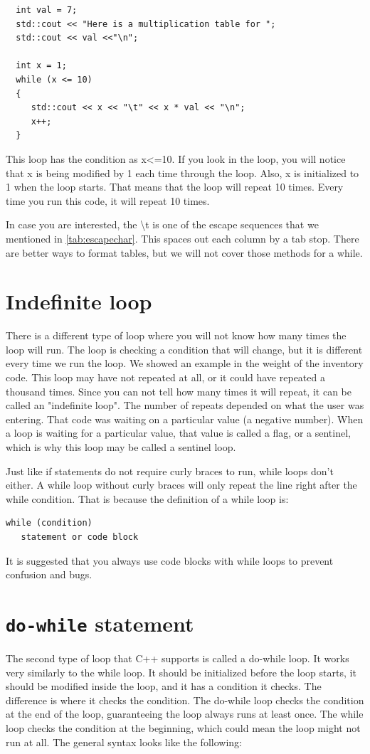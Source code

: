 \begin{lstlisting}
  int val = 7;
  std::cout << "Here is a multiplication table for ";
  std::cout << val <<"\n";
  
  int x = 1;
  while (x <= 10)
  {
     std::cout << x << "\t" << x * val << "\n";
     x++;
  }
\end{lstlisting}
This loop has the condition as x<=10. If you look in the loop, you will notice that
x is being modified by 1 each time through the loop. Also, x is initialized to 1
when the loop starts. That means that the loop will repeat 10 times. Every time you
run this code, it will repeat 10 times.

In case you are interested, the \textbackslash t is one of the escape sequences that
we mentioned in \ref{tab:escapechar}. This spaces out each column by a tab stop. There 
are better ways to format tables, but we will not cover those methods for a while.

\section{Indefinite loop}
There is a different type of loop where you will not know how many times the loop
will run. The loop is checking a condition that will change, but it is different every
time we run the loop. We showed an example in the weight of the inventory code. This 
loop may have not repeated at all, or it could have repeated a thousand times. Since
you can not tell how many times it will repeat, it can be called an "indefinite loop". 
The number of repeats depended on what the user was entering. That code was waiting on a particular value (a negative number).
When a loop is waiting for a particular value, that value is called a flag, or a sentinel, which is why this loop may be
called a sentinel loop. 

Just like if statements do not require curly braces to run, while loops don't either. A while loop without curly braces will only repeat the line right after the while condition. That is because the definition of a while loop is:

\begin{verbatim}
while (condition)
   statement or code block
\end{verbatim}

It is suggested that you always use code blocks with while loops to
prevent confusion and bugs.
\section{{\tt do-while} statement}
The second type of loop that C++ supports is called a do-while loop.
It works very similarly to the while loop. It should be initialized
before the loop starts, it should be modified inside the loop, and
it has a condition it checks. The difference is where it checks the
condition. The do-while loop checks the condition at the end of the
loop, guaranteeing the loop always runs at least once. The while loop
checks the condition at the beginning, which could mean the loop
might not run at all. The general syntax looks like the following:

